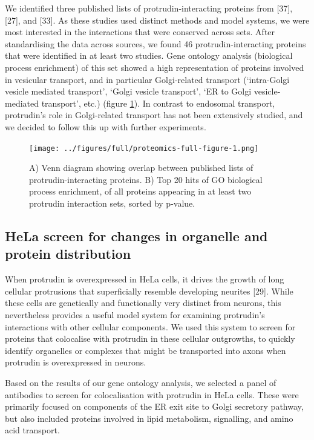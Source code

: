 \documentclass[
  12pt,
  a4paper,
]{book}
\begin{document}
We identified three published lists of protrudin-interacting proteins from {[}37{]}, {[}27{]}, and {[}33{]}. As these studies used distinct methods and model systems, we were most interested in the interactions that were conserved across sets. After standardising the data across sources, we found 46 protrudin-interacting proteins that were identified in at least two studies. Gene ontology analysis (biological process enrichment) of this set showed a high representation of proteins involved in vesicular transport, and in particular Golgi-related transport (`intra-Golgi vesicle mediated transport', `Golgi vesicle transport', `ER to Golgi vesicle-mediated transport', etc.) (figure \ref{fig:proteomics-full-figure}). In contrast to endosomal transport, protrudin's role in Golgi-related transport has not been extensively studied, and we decided to follow this up with further experiments.

\begin{figure}
\centering
\texttt{[image: ../figures/full/proteomics-full-figure-1.png]}
\caption{\label{fig:proteomics-full-figure}A) Venn diagram showing overlap between published lists of protrudin-interacting proteins. B) Top 20 hits of GO biological process enrichment, of all proteins appearing in at least two protrudin interaction sets, sorted by p-value.}
\end{figure}

\hypertarget{hela-screen-for-changes-in-organelle-and-protein-distribution}{%
\subsection{HeLa screen for changes in organelle and protein distribution}\label{hela-screen-for-changes-in-organelle-and-protein-distribution}}

When protrudin is overexpressed in HeLa cells, it drives the growth of long cellular protrusions that superficially resemble developing neurites {[}29{]}. While these cells are genetically and functionally very distinct from neurons, this nevertheless provides a useful model system for examining protrudin's interactions with other cellular components. We used this system to screen for proteins that colocalise with protrudin in these cellular outgrowths, to quickly identify organelles or complexes that might be transported into axons when protrudin is overexpressed in neurons.

Based on the results of our gene ontology analysis, we selected a panel of antibodies to screen for colocalisation with protrudin in HeLa cells. These were primarily focused on components of the ER exit site to Golgi secretory pathway, but also included proteins involved in lipid metabolism, signalling, and amino acid transport.
\end{document}
